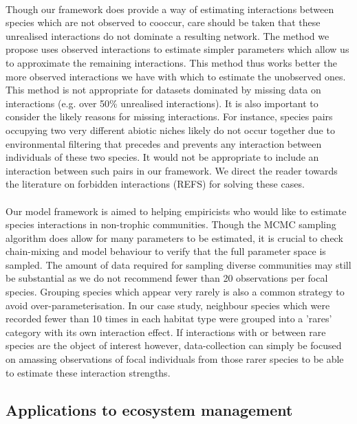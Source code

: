 \documentclass[a4,12pt]{article}
\begin{document}
        \paragraph{}
        Though our framework does provide a way of estimating interactions between species which are not observed to cooccur, care should be taken that these unrealised interactions do not dominate a resulting network. The method we propose uses observed interactions to estimate simpler parameters which allow us to approximate the remaining interactions. This method thus works better the more observed interactions we have with which to estimate the unobserved ones. This method is not appropriate for datasets dominated by missing data on interactions (e.g. over 50\% unrealised interactions). It is also important to consider the likely reasons for missing interactions.  For instance, species pairs occupying two very different abiotic niches likely do not occur together due to environmental filtering that precedes and prevents any interaction between individuals of these two species. It would not be appropriate to include an interaction between such pairs in our framework. We direct the reader towards the literature on forbidden interactions (REFS) for solving these cases. 

        \paragraph{}
        Our model framework is aimed to helping empiricists who would like to estimate species interactions in non-trophic communities. Though the MCMC sampling algorithm does allow for many parameters to be estimated, it is crucial to check chain-mixing and model behaviour to verify that the full parameter space is sampled. The amount of data required for sampling diverse communities may still be substantial as we do not recommend fewer than 20 observations per focal species. Grouping species which appear very rarely is also a common strategy to avoid over-parameterisation. In our case study, neighbour species which were recorded fewer than 10 times in each habitat type were grouped into a 'rares' category with its own interaction effect. If interactions with or between rare species are the object of interest however, data-collection can simply be focused on amassing observations of focal individuals from those rarer species to be able to estimate these interaction strengths.   


    \subsection{Applications to ecosystem management}
\end{document}
